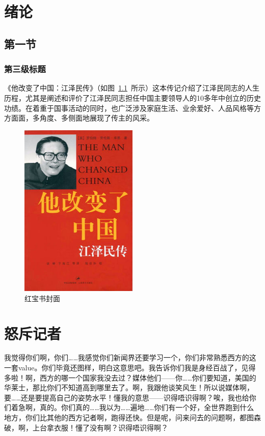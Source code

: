 

\baselineskip=20pt

\chapter{绪论}
\section{第一节}
\subsection{第三级标题}
《他改变了中国：江泽民传》（如图~\ref{book}~所示）这本传记介绍了江泽民同志的人生历程，尤其是阐述和评价了江泽民同志担任中国主要领导人的10多年中创立的历史功绩。在着重于国事活动的同时，也广泛涉及家庭生活、业余爱好、人品风格等方方面面，多角度、多侧面地展现了传主的风采。

	\begin{figure}[htbp!]
		\centering
		\includegraphics[width=0.5\textwidth]{figures/The_Man_Who_Changed_China.png}
		\caption{红宝书封面}\label{book}
		\vspace{-1em}
	\end{figure}	



\chapter{怒斥记者}
我觉得你们啊，你们……我感觉你们新闻界还要学习一个，你们非常熟悉西方的这一套value。你们毕竟还图样，明白这意思吧。我告诉你们我是身经百战了，见得多啦！啊，西方的哪一个国家我没去过？媒体他们——你……你们要知道，美国的华莱士，那比你们不知道高到哪里去了。啊，我跟他谈笑风生！所以说媒体啊，要……还是要提高自己的姿势水平！懂我的意思——识得唔识得啊？唉，我也给你们着急啊，真的。你们真的……我以为……遍地……你们有一个好，全世界跑到什么地方，你们比其他的西方记者啊，跑得还快。但是呢，问来问去的问题啊，都图森破，啊，上台拿衣服！懂了没有啊？识得唔识得啊？

